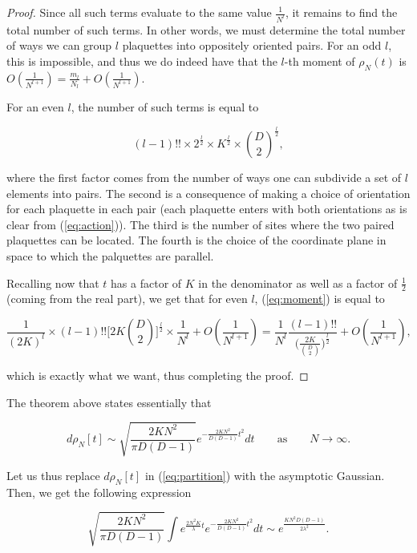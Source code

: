 \documentclass[twoside, a4paper,10pt]{article}
\newcommand{\be}{\begin{equation}}
\newcommand{\ee}{\end{equation}}
\newcommand{\ben}{\begin{equation*}}
\newcommand{\een}{\end{equation*}}
\newcommand{\txt}{\textrm}
\begin{document}
\begin{proof}
Since all such terms evaluate to the same value $\frac{1}{N^l}$, it remains to find the total number of such terms. In other words, we must determine the total number of ways we can group $l$ plaquettes into oppositely oriented pairs. For an odd $l$, this is impossible, and thus we do indeed have that the $l$-th moment of $\rho_N(t)$ is $O ( \frac{1}{N^{l+1}}) = \frac{m_l}{N_l}  +O ( \frac{1}{N^{l+1}}) $. \newline

For an even $l$, the number of such terms is equal to

\ben
(l-1)!!  \times 2 ^{\frac{l}{2}}  \times K^{\frac{l}{2}} \times  {D \choose 2} ^{\frac{l}{2}},
\een 

where the first factor comes from the number of ways one can subdivide a set of $l$ elements into pairs. The second is a consequence of making a choice of orientation for each plaquette in each pair (each plaquette enters with both orientations as is clear from (\ref{eq:action})). The third is the number of sites where the two paired plaquettes can be located. The fourth is the choice of the coordinate plane in space to which the palquettes are parallel. \newline


Recalling now that $t$ has a factor of $K$ in the denominator as well as a factor of $\frac{1}{2}$ (coming from the real part), we get that for even $l$, (\ref{eq:moment}) is equal to

\ben
\frac{1}{(2K)^l}  \times (l-1)!! \bigg [  2 K {D \choose 2}   \bigg ] ^{ \frac{l}{2}  } \times \frac{1}{N^l} + O(\frac{1}{N^{l+1}}) =   \frac{1}{N^l}   \frac{  (l-1)!! }{  \Big (  \frac{2K }{ {D \choose 2}  } \Big )^{\frac{l}{2}} } + O( \frac{1}{N^{l+1}}), 
\een

which is exactly what we want, thus completing the proof.
\end{proof}



The theorem above states essentially that  

\be
\label{eq:asymptotic}
d \rho_N[t] \sim \sqrt{\frac{2 KN^2}{\pi D (D-1)}}   e^{- \frac{2KN^2}{D(D-1)} t^2   } dt \qquad \txt{as} \qquad N \to \infty.
\ee



Let us thus replace $d \rho_N[t]$ in (\ref{eq:partition}) with the asymptotic Gaussian. Then, we get the following expression


\be
\label{eq:partition2}
\sqrt{\frac{2KN^2}{\pi D (D-1)}}  \int e^{ \frac{2 N^2 K}{\lambda} t   }  e^{ - \frac{2KN^2}{D(D-1)} t^2    } dt  \sim     e^{   \frac{ K N^2 D (D-1)  }{ 2 \lambda^2  }   }  .
\ee
\end{document}
